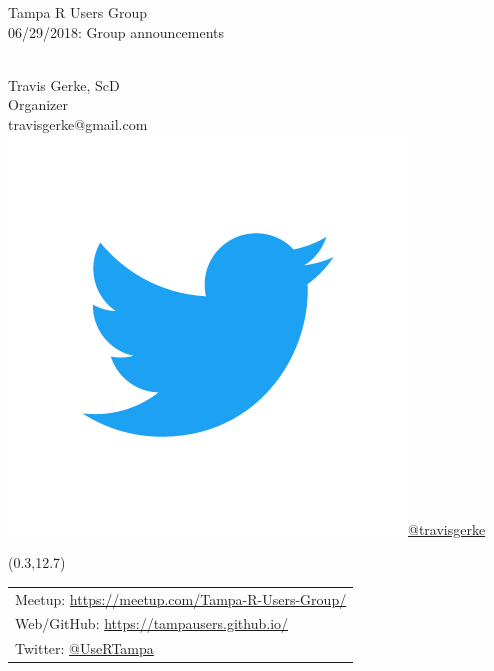 \documentclass{beamer}
\begin{document}
\begin{frame}
\vspace{4cm}
\begin{center}
\normalsize{Tampa R Users Group}\\
\normalsize{06/29/2018: Group announcements}\\
\vspace{.2cm}~
\vspace{1cm}
\end{center}

\vspace{.2cm}
\begin{flushright}
\scriptsize{Travis Gerke, ScD}\\
\tiny{Organizer}\\
\tiny{travisgerke@gmail.com}\\
\includegraphics[scale=.02, trim=0 1cm 0 3.5cm, clip]{figures/Twitter_Logo_Blue.png}\tiny{\href{https://twitter.com/travisgerke}{@travisgerke}}\\
\vspace{.11cm}
\end{flushright}

\begin{textblock}{6}(0.3,12.7)
\scriptsize{
\begin{table}[h]
\centering
\begin{tabular}{l}
Meetup: \href{https://meetup.com/Tampa-R-Users-Group/}{https://meetup.com/Tampa-R-Users-Group/}\\
Web/GitHub: \href{https://tampausers.github.io/}{https://tampausers.github.io/}\\
Twitter: \href{https://twitter.com/usertampa}{@UseRTampa}\\
\end{tabular}
\end{table}
}
\end{textblock}


\end{frame}
\end{document}
